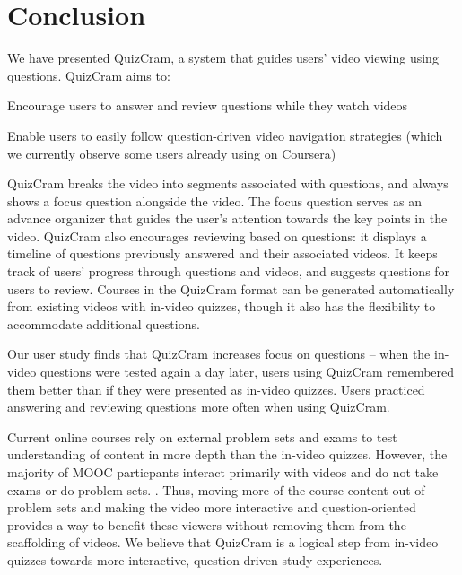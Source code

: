 \documentclass{chi-ext}
\begin{document}
\section{Conclusion}
We have presented QuizCram, a system that guides users' video viewing using questions. QuizCram aims to:

\begin{compactenum}
\item Encourage users to answer and review questions while they watch videos
\item Enable users to easily follow question-driven video navigation strategies (which we currently observe some users already using on Coursera)
\end{compactenum}

QuizCram breaks the video into segments associated with questions, and always shows a focus question alongside the video. The focus question serves as an advance organizer that guides the user's attention towards the key points in the video. QuizCram also encourages reviewing based on questions: it displays a timeline of questions previously answered and their associated videos. It keeps track of users' progress through questions and videos, and suggests questions for users to review. Courses in the QuizCram format can be generated automatically from existing videos with in-video quizzes, though it also has the flexibility to accommodate additional questions.


Our user study finds that QuizCram increases focus on questions -- when the in-video questions were tested again a day later, users using QuizCram remembered them better than if they were presented as in-video quizzes. Users practiced answering and reviewing questions more often when using QuizCram. %

Current online courses rely on external problem sets and exams to test understanding of content in more depth than the in-video quizzes. However, the majority of MOOC particpants interact primarily with videos and do not take exams or do problem sets. \cite{anderson2014engaging}. Thus, moving more of the course content out of problem sets and making the video more interactive and question-oriented provides a way to benefit these viewers without removing them from the scaffolding of videos. We believe that QuizCram is a logical step from in-video quizzes towards more interactive, question-driven study experiences.
\end{document}
